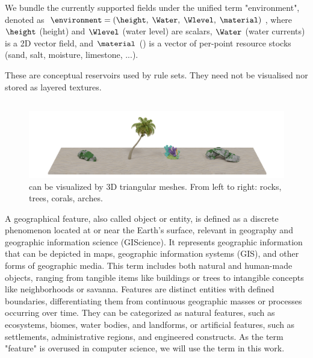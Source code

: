 We bundle the currently supported fields under the unified term "environment", denoted as $\environment = (\height,\; \Water,\; \Wlevel,\; \material)$,  
where $\height$ (height) and $\Wlevel$ (water level) are scalars, $\Water$ (water currents) is a 2D vector field, and $\material$ () is a vector of per-point resource stocks (sand, salt, moisture, limestone, ...). 

These  are conceptual reservoirs used by rule sets. They need not be visualised nor stored as layered textures.

\subsection{}
\label{sec:env-obj_environmental-objects}

\begin{figure}
    \includegraphics{assets-demo.pdf}
    \caption{ can be visualized by 3D triangular meshes. From left to right: rocks, trees, corals, arches.}
    \label{fig:env-obj_assets}
\end{figure}

A geographical feature, also called object or entity, is defined as a discrete phenomenon located at or near the Earth's surface, relevant in geography and geographic information science (GIScience). It represents geographic information that can be depicted in maps, geographic information systems (GIS), and other forms of geographic media. This term includes both natural and human-made objects, ranging from tangible items like buildings or trees to intangible concepts like neighborhoods or savanna. Features are distinct entities with defined boundaries, differentiating them from continuous geographic masses or processes occurring over time. They can be categorized as natural features, such as ecosystems, biomes, water bodies, and landforms, or artificial features, such as settlements, administrative regions, and engineered constructs. As the term "feature" is overused in computer science, we will use the term  in this work.

